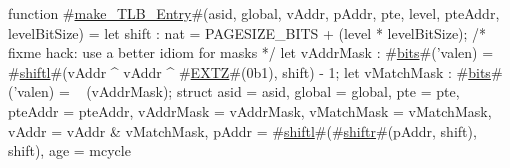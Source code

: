 function #\hyperref[sailRISCVzmakezyTLBzyEntry]{make\_TLB\_Entry}#(asid, global, vAddr, pAddr, pte, level, pteAddr, levelBitSize) = {
  let shift : nat = PAGESIZE_BITS + (level * levelBitSize);
  /* fixme hack: use a better idiom for masks */
  let vAddrMask  : #\hyperref[sailRISCVzbits]{bits}#('valen) = #\hyperref[sailRISCVzshiftl]{shiftl}#(vAddr ^ vAddr ^ #\hyperref[sailRISCVzEXTZ]{EXTZ}#(0b1), shift) - 1;
  let vMatchMask : #\hyperref[sailRISCVzbits]{bits}#('valen) = ~ (vAddrMask);
  struct {
    asid = asid,
    global = global,
    pte = pte,
    pteAddr = pteAddr,
    vAddrMask = vAddrMask,
    vMatchMask = vMatchMask,
    vAddr = vAddr & vMatchMask,
    pAddr = #\hyperref[sailRISCVzshiftl]{shiftl}#(#\hyperref[sailRISCVzshiftr]{shiftr}#(pAddr, shift), shift),
    age = mcycle
  }
}
